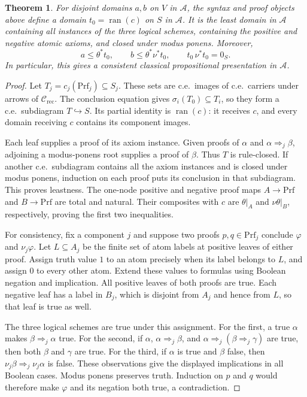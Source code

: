 \documentclass[11pt]{article}
\newtheorem{theorem}{Theorem}[section]
\newcommand{\ran}{\operatorname{ran}}
\begin{document}
\begin{theorem}\label{thm:fork-proof-presentation}
For disjoint domains $a,b$ on $V$ in $\mathcal A$, the syntax and
proof objects above define a domain $t_0=\ran(c)$ on $S$ in
$\mathcal A$. It is the least domain in $\mathcal A$ containing
all instances of the three logical schemes, containing the
positive and negative atomic axioms, and closed under modus ponens.
Moreover,
\[
 a\le\theta^*t_0,\qquad
 b\le\theta^*\nu^*t_0,\qquad
 t_0\,\nu^*t_0=0_S.
\]
In particular, this gives a consistent classical propositional
presentation in $\mathcal A$.
\end{theorem}
\begin{proof}
Let $T_j=c_j(\mathrm{Prf}_j)\subseteq S_j$.
These sets are c.e.\ images of c.e.\ carriers under
arrows of $\mathcal C_{\mathrm{rec}}$. The conclusion equation gives
$\sigma_i(T_0)\subseteq T_i$, so they form a c.e.\
subdiagram $T\hookrightarrow S$. Its partial identity is
$\ran(c)$: it receives $c$, and every domain receiving $c$
contains its component images.

Each leaf supplies a proof of its axiom instance. Given proofs
of $\alpha$ and $\alpha\Rightarrow_j\beta$, adjoining a
modus-ponens root supplies a proof of $\beta$. Thus $T$ is
rule-closed. If another c.e.\ subdiagram contains all
the axiom instances and is closed under modus ponens, induction
on each proof puts its conclusion in that subdiagram. This
proves leastness. The one-node positive and negative proof maps
$A\to\mathrm{Prf}$ and $B\to\mathrm{Prf}$ are total and natural.
Their composites with $c$ are $\theta|_A$ and
$\nu\theta|_B$, respectively, proving the first two inequalities.

For consistency, fix a component $j$ and suppose two proofs
$p,q\in\mathrm{Prf}_j$ conclude $\varphi$ and $\nu_j\varphi$.
Let $L\subseteq A_j$ be the finite set of atom labels at
positive leaves of either proof. Assign truth value $1$ to an
atom precisely when its label belongs to $L$, and assign $0$
to every other atom. Extend these values to formulas using
Boolean negation and implication.
All positive leaves of both proofs are true. Each negative
leaf has a label in $B_j$, which is disjoint from $A_j$ and
hence from $L$, so that leaf is true as well.

The three logical schemes are true under this assignment.
For the first, a true $\alpha$ makes
$\beta\Rightarrow_j\alpha$ true. For the second, if
$\alpha$, $\alpha\Rightarrow_j\beta$, and
$\alpha\Rightarrow_j(\beta\Rightarrow_j\gamma)$ are true,
then both $\beta$ and $\gamma$ are true. For the third, if
$\alpha$ is true and $\beta$ false, then
$\nu_j\beta\Rightarrow_j\nu_j\alpha$ is false.
These observations give the displayed implications in all
Boolean cases. Modus ponens preserves truth. Induction on
$p$ and $q$ would therefore make $\varphi$ and its negation
both true, a contradiction.


\end{proof}
\end{document}
